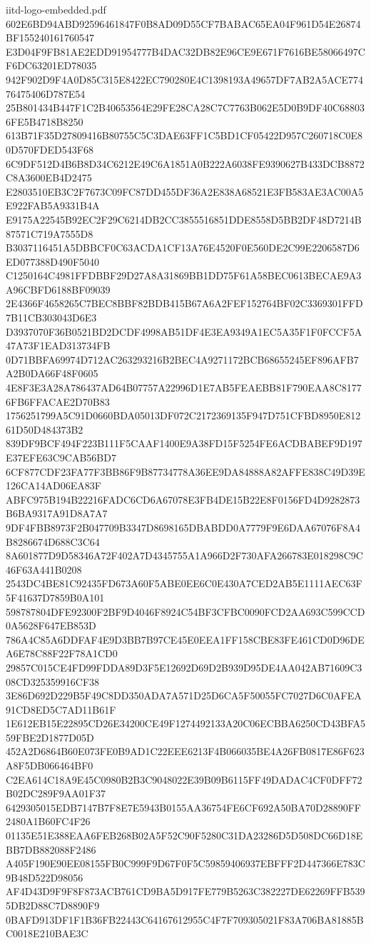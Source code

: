 \begin{filecontents*}[overwrite]{iitd-logo-embedded.pdf}
602E6BD94ABD92596461847F0B8AD09D55CF7BABAC65EA04F961D54E26874BF155240161760547
E3D04F9FB81AE2EDD91954777B4DAC32DB82E96CE9E671F7616BE58066497CF6DC63201ED78035
942F902D9F4A0D85C315E8422EC790280E4C1398193A49657DF7AB2A5ACE77476475406D787E54
25B801434B447F1C2B40653564E29FE28CA28C7C7763B062E5D0B9DF40C688036FE5B4718B8250
613B71F35D27809416B80755C5C3DAE63FF1C5BD1CF05422D957C260718C0E80D570FDED543F68
6C9DF512D4B6B8D34C6212E49C6A1851A0B222A6038FE9390627B433DCB8872C8A3600EB4D2475
E2803510EB3C2F7673C09FC87DD455DF36A2E838A68521E3FB583AE3AC00A5E922FAB5A9331B4A
E9175A22545B92EC2F29C6214DB2CC3855516851DDE8558D5BB2DF48D7214B87571C719A7555D8
B3037116451A5DBBCF0C63ACDA1CF13A76E4520F0E560DE2C99E2206587D6ED077388D490F5040
C1250164C4981FFDBBF29D27A8A31869BB1DD75F61A58BEC0613BECAE9A3A96CBFD6188BF09039
2E4366F4658265C7BEC8BBF82BDB415B67A6A2FEF152764BF02C3369301FFD7B11CB303043D6E3
D3937070F36B0521BD2DCDF4998AB51DF4E3EA9349A1EC5A35F1F0FCCF5A47A73F1EAD313734FB
0D71BBFA69974D712AC263293216B2BEC4A9271172BCB68655245EF896AFB7A2B0DA66F48F0605
4E8F3E3A28A786437AD64B07757A22996D1E7AB5FEAEBB81F790EAA8C81776FB6FFACAE2D70B83
1756251799A5C91D0660BDA05013DF072C2172369135F947D751CFBD8950E81261D50D484373B2
839DF9BCF494F223B111F5CAAF1400E9A38FD15F5254FE6ACDBABEF9D197E37EFE63C9CAB56BD7
6CF877CDF23FA77F3BB86F9B87734778A36EE9DA84888A82AFFE838C49D39E126CA14AD06EA83F
ABFC975B194B22216FADC6CD6A67078E3FB4DE15B22E8F0156FD4D9282873B6BA9317A91D8A7A7
9DF4FBB8973F2B047709B3347D8698165DBABDD0A7779F9E6DAA67076F8A4B8286674D688C3C64
8A601877D9D58346A72F402A7D4345755A1A966D2F730AFA266783E018298C9C46F63A441B0208
2543DC4BE81C92435FD673A60F5ABE0EE6C0E430A7CED2AB5E1111AEC63F5F41637D7859B0A101
598787804DFE92300F2BF9D4046F8924C54BF3CFBC0090FCD2AA693C599CCD0A5628F647EB853D
786A4C85A6DDFAF4E9D3BB7B97CE45E0EEA1FF158CBE83FE461CD0D96DEA6E78C88F22F78A1CD0
29857C015CE4FD99FDDA89D3F5E12692D69D2B939D95DE4AA042AB71609C308CD325359916CF38
3E86D692D229B5F49C8DD350ADA7A571D25D6CA5F50055FC7027D6C0AFEA91CD8ED5C7AD11B61F
1E612EB15E22895CD26E34200CE49F1274492133A20C06ECBBA6250CD43BFA559FBE2D1877D05D
452A2D6864B60E073FE0B9AD1C22EEE6213F4B066035BE4A26FB0817E86F623A8F5DB066464BF0
C2EA614C18A9E45C0980B2B3C9048022E39B09B6115FF49DADAC4CF0DFF72B02DC289F9AA01F37
6429305015EDB7147B7F8E7E5943B0155AA36754FE6CF692A50BA70D28890FF2480A1B60FC4F26
01135E51E388EAA6FEB268B02A5F52C90F5280C31DA23286D5D508DC66D18EBB7DB882088F2486
A405F190E90EE08155FB0C999F9D67F0F5C59859406937EBFFF2D447366E783C9B48D522D98056
AF4D43D9F9F8F873ACB761CD9BA5D917FE779B5263C382227DE62269FFB5395DB2D88C7D8890F9
0BAFD913DF1F1B36FB22443C64167612955C4F7F709305021F83A706BA81885BC0018E210BAE3C

\end{filecontents*}
